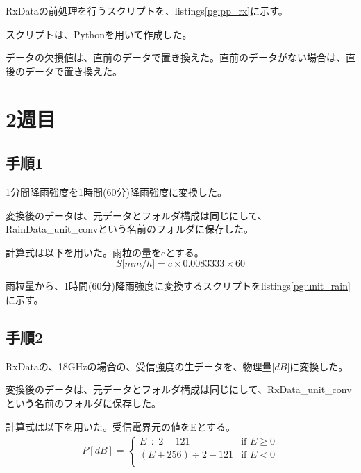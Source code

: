 \documentclass[a4paper, 11pt, titlepage]{jsarticle}
\begin{document}
RxDataの前処理を行うスクリプトを、listings\ref{pg:pp_rx}に示す。

スクリプトは、Pythonを用いて作成した。

データの欠損値は、直前のデータで置き換えた。直前のデータがない場合は、直後のデータで置き換えた。





\section{2週目}
\subsection{手順1}
1分間降雨強度を1時間(60分)降雨強度に変換した。

変換後のデータは、元データとフォルダ構成は同じにして、RainData\_unit\_convという名前のフォルダに保存した。

計算式は以下を用いた。雨粒の量をcとする。
$$
S \lbrack mm/h \rbrack = c \times 0.0083333 \times 60
$$

雨粒量から、1時間(60分)降雨強度に変換するスクリプトをlistings\ref{pg:unit_rain}に示す。



\subsection{手順2}
RxDataの、18GHzの場合の、受信強度の生データを、物理量$\lbrack dB \rbrack$に変換した。

変換後のデータは、元データとフォルダ構成は同じにして、RxData\_unit\_convという名前のフォルダに保存した。

計算式は以下を用いた。受信電界元の値をEとする。
\begin{align*}
	P [dB] = 
	\begin{cases}
		E \div 2 - 121 & \text{if $E \geq 0$}\\
		(E + 256) \div 2 - 121 & \text{if $E < 0$}\\
	\end{cases}
\end{align*}
\end{document}
